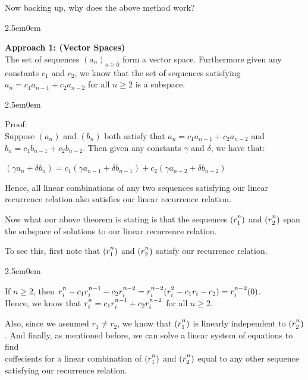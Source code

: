 \documentclass{book}
\newcommand{\hTwo}{%
\color{MidnightBlue}%
   \fontsize{13}{15}\selectfont%
}
\newcommand{\hThree}{%
   \color{PineGreen!85!Orange}
   \fontsize{12}{14}\selectfont%
}
\newenvironment{myIndent}{%
   \begin{adjustwidth}{2.5em}{0em}%
}{%
   \end{adjustwidth}%
}
\newcommand{\blab}[1]{\textbf{#1}}
\newcommand{\retTwo}{\hfill\bigbreak}
\begin{document}
Now backing up, why does the above method work?\\
\begin{myIndent}\hTwo

   \blab{Approach 1: (Vector Spaces)}\\
   The set of sequences $(a_n)_{n\geq 0}$ form a vector space. Furthermore given any constants $c_1$ and $c_2$, we know that the set of sequences satisfying $a_n = c_1a_{n-1} + c_2a_{n-2}$ for all $n \geq 2$ is a subspace.
   
   \begin{myIndent}\hThree
      Proof:\\
      Suppose $(a_n)$ and $(b_n)$ both satisfy that $a_n = c_1a_{n-1} + c_2a_{n-2}$ and\\ $b_n = c_1b_{n-1} + c_2b_{n-2}$. Then given any constants $\gamma$ and $\delta$, we have that:

      {\centering $(\gamma a_n + \delta b_n) = c_1(\gamma a_{n-1} + \delta b_{n-1}) + c_2(\gamma a_{n-2} + \delta b_{n-2})$ \retTwo\par}

      Hence, all linear combinations of any two sequences satisfying our linear\\ recurrence relation also satisfies our linear recurrence relation.\retTwo
   \end{myIndent}

   Now what our above theorem is stating is that the sequences $(r_1^{\vphantom{|}n})$ and $(r_2^{\vphantom{|}n})$ span the subspace of solutions to our linear recurrence relation.\retTwo

   To see this, first note that $(r_1^{\vphantom{|}n})$ and $(r_2^{\vphantom{|}n})$ satisfy our recurrence relation.
   \begin{myIndent}\hThree
      If $n \geq 2$, then $r_i^{\vphantom{|}n} - c_1r_i^{\vphantom{|}n-1} - c_2r_i^{\vphantom{|}n-2} = r_i^{\vphantom{|}n-2}(r_i^{\vphantom{|}2} - c_1r_i - c_2) = r_i^{\vphantom{|}n-2} (0)$.\\ Hence, we know that $r_i^{\vphantom{|}n} = c_1r_i^{\vphantom{|}n-1} + c_2r_i^{\vphantom{|}n-2}$ for all $n \geq 2$.\newpage
   \end{myIndent}

   Also, since we assumed $r_1 \neq r_2$, we know that $(r_1^{\vphantom{|}n})$ is linearly independent to $(r_2^{\vphantom{|}n})$. And finally, as mentioned before, we can solve a linear system of equations to find\\ [-2pt] coffecients for a linear combination of $(r_1^{\vphantom{|}n})$ and $(r_2^{\vphantom{|}n})$ equal to any other sequence satisfying our recurrence relation.\retTwo


\end{myIndent}
\end{document}
